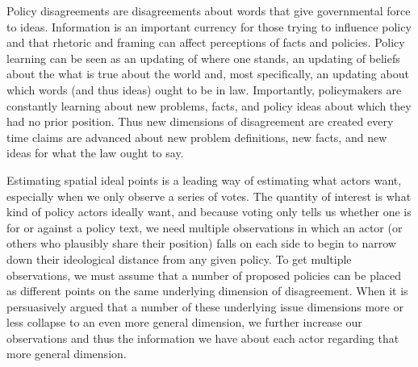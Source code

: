 


Policy disagreements are disagreements about words that give governmental force to ideas. Information is an important currency for those trying to influence policy and that rhetoric and framing can affect perceptions of facts and policies. Policy learning can be seen as an updating of where one stands, an updating of beliefs about the what is true about the world and, most specifically, an updating about which words (and thus ideas) ought to be in law. Importantly, policymakers are constantly learning about new problems, facts, and policy ideas about which they had no prior position. Thus new dimensions of disagreement are created every time claims are advanced about new problem definitions, new facts, and new ideas for what the law ought to say.

Estimating spatial ideal points is a leading way of estimating what actors want, especially when we only observe a series of votes. The quantity of interest is what kind of policy actors ideally want, and because voting only tells us whether one is for or against a policy text, we need multiple observations in which an actor (or others who plausibly share their position) falls on each side to begin to narrow down their ideological distance from any given policy. To get multiple observations, we must assume that a number of proposed policies can be placed as different points on the same underlying dimension of disagreement. When it is persuasively argued that a number of these underlying issue dimensions more or less collapse to an even more general dimension, we further increase our observations and thus the information we have about each actor regarding that more general dimension. 

